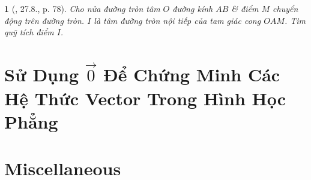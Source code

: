 \documentclass{article}
\newtheorem{baitoan}{}
\begin{document}
\begin{baitoan}[\cite{Hai_Hung_Thu_Tung_ncpt_Toan_10_tap_2}, 27.8., p. 78]
	Cho nửa đường tròn tâm $O$ đường kính $AB$ \& điểm $M$ chuyển động trên đường tròn. $I$ là tâm đường tròn nội tiếp của tam giác cong $OAM$. Tìm quỹ tích điểm $I$.
\end{baitoan}


\section{Sử Dụng $\vec{0}$ Để Chứng Minh Các Hệ Thức Vector Trong Hình Học Phẳng}


\section{Miscellaneous}


\printbibliography[heading=bibintoc]
	
\end{document}
